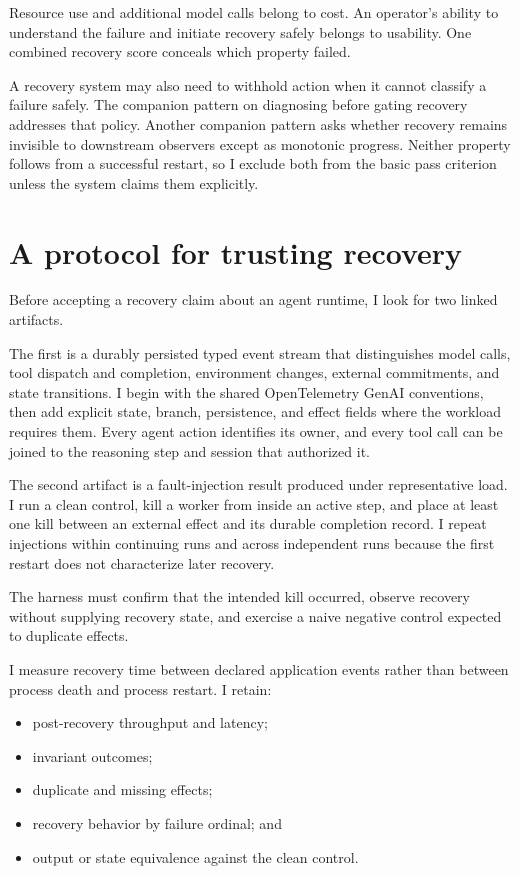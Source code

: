 Resource use and additional model calls belong to cost. An operator's ability to understand the failure and initiate recovery safely belongs to usability. One combined recovery score conceals which property failed.

A recovery system may also need to withhold action when it cannot classify a failure safely. The companion pattern on diagnosing before gating recovery addresses that policy. Another companion pattern asks whether recovery remains invisible to downstream observers except as monotonic progress. Neither property follows from a successful restart, so I exclude both from the basic pass criterion unless the system claims them explicitly.

\section{A protocol for trusting recovery}\label{a-protocol-for-trusting-recovery}

Before accepting a recovery claim about an agent runtime, I look for two linked artifacts.

The first is a durably persisted typed event stream that distinguishes model calls, tool dispatch and completion, environment changes, external commitments, and state transitions. I begin with the shared OpenTelemetry GenAI conventions, then add explicit state, branch, persistence, and effect fields where the workload requires them. Every agent action identifies its owner, and every tool call can be joined to the reasoning step and session that authorized it.

The second artifact is a fault-injection result produced under representative load. I run a clean control, kill a worker from inside an active step, and place at least one kill between an external effect and its durable completion record. I repeat injections within continuing runs and across independent runs because the first restart does not characterize later recovery.

The harness must confirm that the intended kill occurred, observe recovery without supplying recovery state, and exercise a naive negative control expected to duplicate effects.

I measure recovery time between declared application events rather than between process death and process restart. I retain:

\begin{itemize}
\tightlist
\item
  post-recovery throughput and latency;
\item
  invariant outcomes;
\item
  duplicate and missing effects;
\item
  recovery behavior by failure ordinal; and
\item
  output or state equivalence against the clean control.
\end{itemize}

